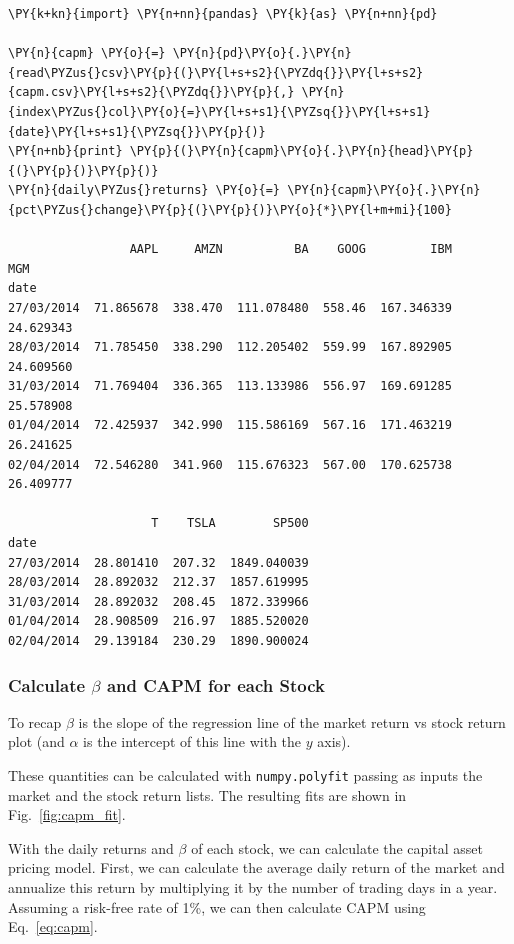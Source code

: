 \begin{tcolorbox}[breakable, size=fbox, boxrule=1pt, pad at break*=1mm,colback=cellbackground, colframe=cellborder]
\begin{Verbatim}[commandchars=\\\{\}]
\PY{k+kn}{import} \PY{n+nn}{pandas} \PY{k}{as} \PY{n+nn}{pd}
		
\PY{n}{capm} \PY{o}{=} \PY{n}{pd}\PY{o}{.}\PY{n}{read\PYZus{}csv}\PY{p}{(}\PY{l+s+s2}{\PYZdq{}}\PY{l+s+s2}{capm.csv}\PY{l+s+s2}{\PYZdq{}}\PY{p}{,} \PY{n}{index\PYZus{}col}\PY{o}{=}\PY{l+s+s1}{\PYZsq{}}\PY{l+s+s1}{date}\PY{l+s+s1}{\PYZsq{}}\PY{p}{)}
\PY{n+nb}{print} \PY{p}{(}\PY{n}{capm}\PY{o}{.}\PY{n}{head}\PY{p}{(}\PY{p}{)}\PY{p}{)}
\PY{n}{daily\PYZus{}returns} \PY{o}{=} \PY{n}{capm}\PY{o}{.}\PY{n}{pct\PYZus{}change}\PY{p}{(}\PY{p}{)}\PY{o}{*}\PY{l+m+mi}{100}

                 AAPL     AMZN          BA    GOOG         IBM        MGM 
date
27/03/2014  71.865678  338.470  111.078480  558.46  167.346339  24.629343
28/03/2014  71.785450  338.290  112.205402  559.99  167.892905  24.609560
31/03/2014  71.769404  336.365  113.133986  556.97  169.691285  25.578908
01/04/2014  72.425937  342.990  115.586169  567.16  171.463219  26.241625
02/04/2014  72.546280  341.960  115.676323  567.00  170.625738  26.409777

                    T    TSLA        SP500
date
27/03/2014  28.801410  207.32  1849.040039
28/03/2014  28.892032  212.37  1857.619995
31/03/2014  28.892032  208.45  1872.339966
01/04/2014  28.908509  216.97  1885.520020
02/04/2014  29.139184  230.29  1890.900024
\end{Verbatim}
\end{tcolorbox}

\subsubsection{Calculate $\beta$ and CAPM for each Stock}
To recap $\beta$ is the slope of the regression line of the market return vs stock return plot (and $\alpha$ is the intercept of this line with the $y$ axis).

These quantities can be calculated with \texttt{numpy.polyfit} passing as inputs the market and the stock return lists. 
The resulting fits are shown in Fig.~\ref{fig:capm_fit}.

With the daily returns and $\beta$ of each stock, we can calculate the capital asset pricing model. First, we can calculate the average daily return of the market and annualize this return by multiplying it by the number of trading days in a year.
Assuming a risk-free rate of 1\%, we can then calculate CAPM using  Eq.~\ref{eq:capm}.

